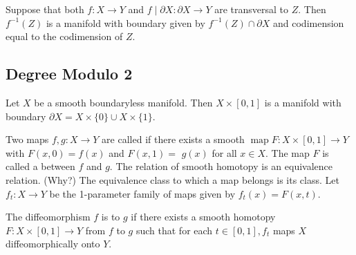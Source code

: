 \documentclass[a4paper]{scrartcl}
\begin{document}
\begin{theorem}
    Suppose that both $f: X \rightarrow Y$ and $f \mid \partial X: \partial X \rightarrow Y$ are transversal to $Z$. Then $f^{-1}(Z)$ is a manifold with boundary given by $f^{-1}(Z) \cap \partial X$ and codimension equal to the codimension of $Z$.
\end{theorem}

\subsection{Degree Modulo 2}

Let $X$ be a smooth boundaryless manifold. Then $X \times[0,1]$ is a manifold with boundary $\partial X=X \times\{0\} \cup X \times\{1\}$.

\begin{definition}
    Two maps $f, g: X \rightarrow Y$ are called  if there exists a smooth $\operatorname{map} F: X \times[0,1] \rightarrow Y$ with $F(x, 0)=f(x)$ and $F(x, 1)=$ $g(x)$ for all $x \in X$. The map $F$ is called a  between $f$ and $g$. The relation of smooth homotopy is an equivalence relation. (Why?) The equivalence class to which a map belongs is its  class. Let $f_{t}: X \rightarrow Y$ be the 1-parameter family of maps given by $f_{t}(x)=F(x, t)$.
\end{definition}

\begin{definition}
    The diffeomorphism $f$ is  to $g$ if there exists a smooth homotopy $F: X \times[0,1] \rightarrow Y$ from $f$ to $g$ such that for each $t \in[0,1], f_{t}$ maps $X$ diffeomorphically onto $Y$.
\end{definition}
\end{document}
